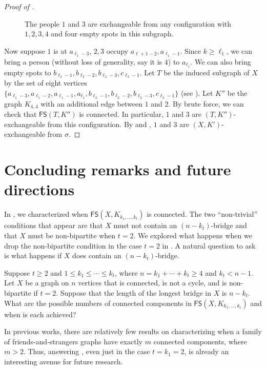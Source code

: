 \documentclass{mystyle}
\newcommand{\FS}{\mathsf{FS}}
\begin{document}
\begin{proof}[Proof of ]
\begin{figure}[ht]
        \caption{The people $1$ and $3$ are exchangeable from any configuration with $1, 2, 3, 4$ and four empty spots in this subgraph.}
        \label{fig_22}
    \end{figure}
    
    Now suppose $1$ is at $a_{\ell_1 - 3}$, $2, 3$ occupy $a_{\ell+1 - 2}, a_{\ell_1 - 1}$. Since $k \geq \ell_1$, we can bring a person (without loss of generality, say it is $4$) to $a_{\ell_1}$. We can also bring empty spots to $b_{\ell_2 - 1}, b_{\ell_2 - 2}, b_{\ell_2 - 3}, c_{\ell_3 - 1}$. Let $T$ be the induced subgraph of $X$ by the set of eight vertices $\{a_{\ell_1 - 3},a_{\ell_1 - 2},a_{\ell_1 - 1},a_{\ell_1},b_{\ell_2 - 1}, b_{\ell_2 - 2}, b_{\ell_2 - 3}, c_{\ell_3 - 1}\}$ (see ). Let $K''$ be the graph $K_{4, 4}$ with an additional edge between $1$ and $2$. By brute force, we can check that $\FS(T, K'')$ is connected. In particular, $1$ and $3$ are $(T, K'')$-exchangeable from this configuration. By  and , $1$ and $3$ are $(X, K')$-exchangeable from $\sigma$. 
\end{proof}

\section{Concluding remarks and future directions}\label{sec_conclusion}
In , we characterized when $\FS(X, K_{k_1, \ldots, k_t})$ is connected. The two ``non-trivial'' conditions that appear are that $X$ must not contain an $(n - k_t)$-bridge and that $X$ must be non-bipartite when $t = 2$. We explored what happens when we drop the non-bipartite condition in the case $t = 2$ in . A natural question to ask is what happens if $X$ does contain an $(n - k_t)$-bridge. 
\begin{question}\label{qst_bridge}
    Suppose $t \geq 2$ and $1 \leq k_1 \leq \cdots \leq k_t$, where $n = k_1 + \cdots + k_t \geq 4$ and $k_t < n - 1$. Let $X$ be a graph on $n$ vertices that is connected, is not a cycle, and is non-bipartite if $t = 2$. Suppose that the length of the longest bridge in $X$ is $n - k_t$. What are the possible numbers of connected components in $\FS(X, K_{k_1, \ldots, k_t})$ and when is each achieved? 
\end{question}
In previous works, there are relatively few results on characterizing when a family of friends-and-strangers graphs have exactly $m$ connected components, where $m > 2$. Thus, answering , even just in the case $t = k_1 = 2$, is already an interesting avenue for future research. 



\end{document}

